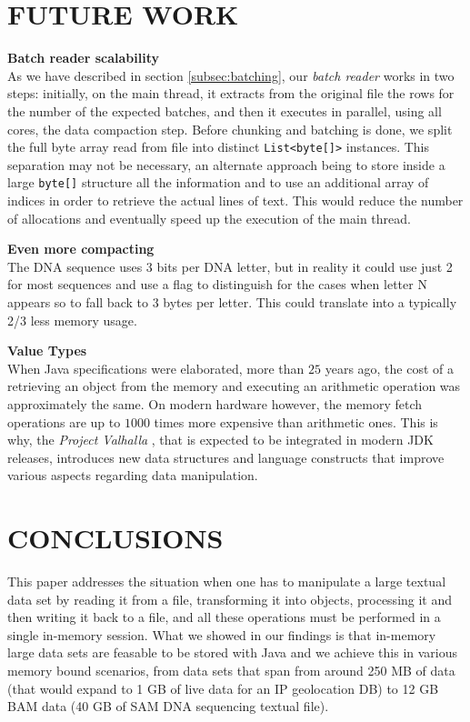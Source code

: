 \documentclass[a4paper,twoside]{article}
\begin{document}
\section{\uppercase{Future work}}
\label{sec:future}

\textbf{Batch reader scalability} \\
As we have described in section \ref{subsec:batching}, our {\textit{batch reader} } works in two steps: initially, on the main thread, it extracts from the original file the rows for the number of the expected batches, and then it executes in parallel, using all cores, the data compaction step.
Before chunking and batching is done, we split the full byte array read from file into distinct  \texttt{List<byte[]>} instances.
This separation may not be necessary, an alternate approach being to store inside a large \texttt{byte[]} structure all the information and to use an additional array of indices in order to retrieve the actual lines of text.
This would reduce the number of allocations and eventually speed up the execution of the main thread.

\textbf{Even more compacting} \\
The DNA sequence uses 3 bits per DNA letter, but in reality it could use just 2 for most sequences and use a flag to distinguish for the cases when letter N appears so to fall back to 3 bytes per letter. This could translate into a typically 2/3 less memory usage. 

\textbf{Value Types} \\
When Java specifications were elaborated, more than $25$ years ago, the cost of a retrieving an object from the memory and executing an arithmetic operation was approximately the same.
On modern hardware however, the memory fetch operations are up to $1000$ times more expensive than arithmetic ones.
This is why, the {\textit{Project Valhalla} } \cite{jdk:valhalla}, that is expected to be integrated in modern JDK releases, introduces new data structures and language constructs that improve various aspects regarding data manipulation.


\section{\uppercase{Conclusions}}
\label{sec:conclusions}
This paper addresses the situation when one has to manipulate a large textual data set by reading it from a file, transforming it into objects, processing it and then writing it back to a file, and all these operations must be performed in a single in-memory session.
What we showed in our findings is that in-memory large data sets are feasable to be stored with Java and we achieve this in various memory bound scenarios, from data sets that span from around 250 MB of data (that would expand to 1 GB of live data for an IP geolocation DB) to 12 GB BAM data (40 GB of SAM DNA sequencing textual file).
\end{document}
